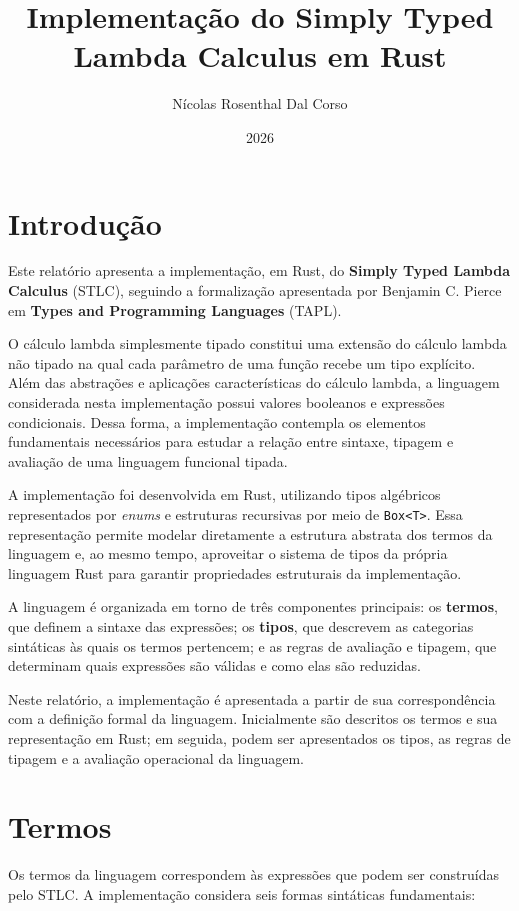 \documentclass[11pt]{article}
\author{Nícolas Rosenthal Dal Corso}
\date{2026}
\title{Implementação do Simply Typed Lambda Calculus em Rust}
\begin{document}
\maketitle
\tableofcontents

\section{Introdução}
\label{sec:org412601e}

Este relatório apresenta a implementação, em Rust, do \textbf{Simply Typed Lambda}
\textbf{Calculus} (STLC), seguindo a formalização apresentada por Benjamin C. Pierce
em \textbf{Types and Programming Languages} (TAPL).

O cálculo lambda simplesmente tipado constitui uma extensão do cálculo lambda
não tipado na qual cada parâmetro de uma função recebe um tipo explícito.
Além das abstrações e aplicações características do cálculo lambda, a
linguagem considerada nesta implementação possui valores booleanos e
expressões condicionais. Dessa forma, a implementação contempla os elementos
fundamentais necessários para estudar a relação entre sintaxe, tipagem e
avaliação de uma linguagem funcional tipada.

A implementação foi desenvolvida em Rust, utilizando tipos algébricos
representados por \emph{enums} e estruturas recursivas por meio de
\texttt{Box<T>}. Essa representação permite modelar diretamente a estrutura
abstrata dos termos da linguagem e, ao mesmo tempo, aproveitar o sistema de
tipos da própria linguagem Rust para garantir propriedades estruturais da
implementação.

A linguagem é organizada em torno de três componentes principais: os
\textbf{termos}, que definem a sintaxe das expressões; os \textbf{tipos}, que descrevem as
categorias sintáticas às quais os termos pertencem; e as regras de avaliação
e tipagem, que determinam quais expressões são válidas e como elas são
reduzidas.

Neste relatório, a implementação é apresentada a partir de sua
correspondência com a definição formal da linguagem. Inicialmente são
descritos os termos e sua representação em Rust; em seguida, podem ser
apresentados os tipos, as regras de tipagem e a avaliação operacional da
linguagem.
\section{Termos}
\label{sec:org1cbfd93}

Os termos da linguagem correspondem às expressões que podem ser construídas
pelo STLC. A implementação considera seis formas sintáticas fundamentais:
\end{document}
